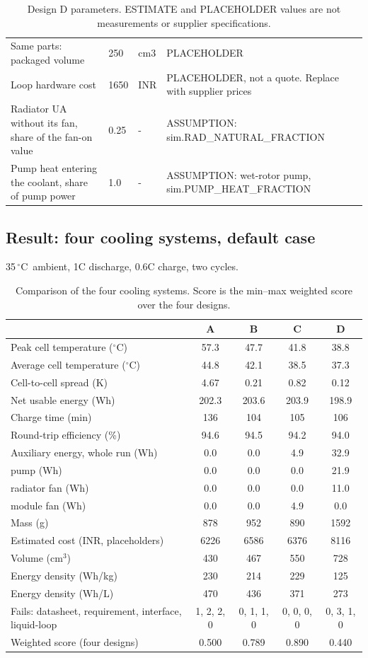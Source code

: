\documentclass[11pt,a4paper]{article}
\newcommand{\degC}{\ensuremath{{}^{\circ}\mathrm{C}}}
\begin{document}
\begin{table}[H]
\begin{tabular}{@{}p{5.4cm}p{1.4cm}p{1.5cm}p{6.7cm}@{}}
Same parts: packaged volume & 250 & cm3 & PLACEHOLDER \\
Loop hardware cost & 1650 & INR & PLACEHOLDER, not a quote. Replace with supplier prices \\
Radiator UA without its fan, share of the fan-on value & 0.25 & - & ASSUMPTION: sim.RAD\_NATURAL\_FRACTION \\
Pump heat entering the coolant, share of pump power & 1.0 & - & ASSUMPTION: wet-rotor pump, sim.PUMP\_HEAT\_FRACTION \\
\bottomrule
\end{tabular}
\caption{Design D parameters. ESTIMATE and PLACEHOLDER values are not measurements or supplier specifications.}
\end{table}

\subsection{Result: four cooling systems, default case}
35\,\degC\ ambient, 1C discharge, 0.6C charge, two cycles.
\begin{table}[H]
\centering\scriptsize
\begin{tabular}{@{}p{4.1cm}cccc@{}}
\toprule
 & A & B & C & D \\
\midrule
Peak cell temperature (\degC) & 57.3 & 47.7 & 41.8 & 38.8 \\
Average cell temperature (\degC) & 44.8 & 42.1 & 38.5 & 37.3 \\
Cell-to-cell spread (K) & 4.67 & 0.21 & 0.82 & 0.12 \\
Net usable energy (Wh) & 202.3 & 203.6 & 203.9 & 198.9 \\
Charge time (min) & 136 & 104 & 105 & 106 \\
Round-trip efficiency (\%) & 94.6 & 94.5 & 94.2 & 94.0 \\
Auxiliary energy, whole run (Wh) & 0.0 & 0.0 & 4.9 & 32.9 \\
\quad pump (Wh) & 0.0 & 0.0 & 0.0 & 21.9 \\
\quad radiator fan (Wh) & 0.0 & 0.0 & 0.0 & 11.0 \\
\quad module fan (Wh) & 0.0 & 0.0 & 4.9 & 0.0 \\
Mass (g) & 878 & 952 & 890 & 1592 \\
Estimated cost (INR, placeholders) & 6226 & 6586 & 6376 & 8116 \\
Volume (cm$^3$) & 430 & 467 & 550 & 728 \\
Energy density (Wh/kg) & 230 & 214 & 229 & 125 \\
Energy density (Wh/L) & 470 & 436 & 371 & 273 \\
\midrule
Fails: datasheet, requirement, interface, liquid-loop & 1, 2, 2, 0 & 0, 1, 1, 0 & 0, 0, 0, 0 & 0, 3, 1, 0 \\
Weighted score (four designs) & 0.500 & 0.789 & 0.890 & 0.440 \\
\bottomrule
\end{tabular}
\caption{Comparison of the four cooling systems. Score is the min--max weighted score over the four designs.}\label{tab:cmp4}
\end{table}
\end{document}

